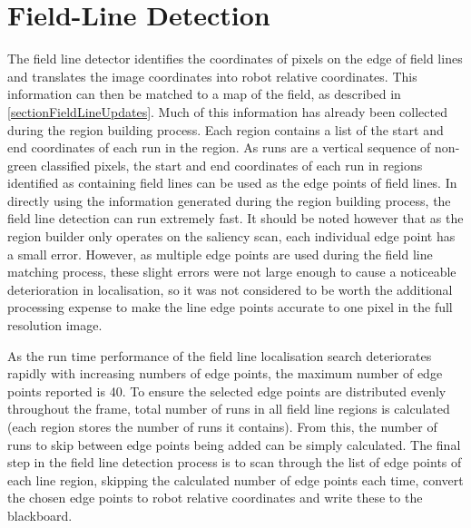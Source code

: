 \documentclass[pdftex,11pt,a4paper]{report}
\begin{document}
\section{Field-Line Detection} \label{sectionFieldLineDetection}
The field line detector identifies the coordinates of pixels on the edge of field lines and translates the image coordinates into robot relative coordinates. This information can then be matched to a map of the field, as described in \autoref{sectionFieldLineUpdates}. Much of this information has already been collected during the region building process. Each region contains a list of the start and end coordinates of each run in the region. As runs are a vertical sequence of non-green classified pixels, the start and end coordinates of each run in regions identified as containing field lines can be used as the edge points of field lines. In directly using the information generated during the region building process, the field line detection can run extremely fast. It should be noted however that as the region builder only operates on the saliency scan, each individual edge point has a small error. However, as multiple edge points are used during the field line matching process, these slight errors were not large enough to cause a noticeable deterioration in localisation, so it was not considered to be worth the additional processing expense to make the line edge points accurate to one pixel in the full resolution image.

As the run time performance of the field line localisation search deteriorates rapidly with increasing numbers of edge points, the maximum number of edge points reported is 40. To ensure the selected edge points are distributed evenly throughout the frame, total number of runs in all field line regions is calculated (each region stores the number of runs it contains). From this, the number of runs to skip between edge points being added can be simply calculated. The final step in the field line detection process is to scan through the list of edge points of each line region, skipping the calculated number of edge points each time, convert the chosen edge points to robot relative coordinates and write these to the blackboard.
\end{document}
